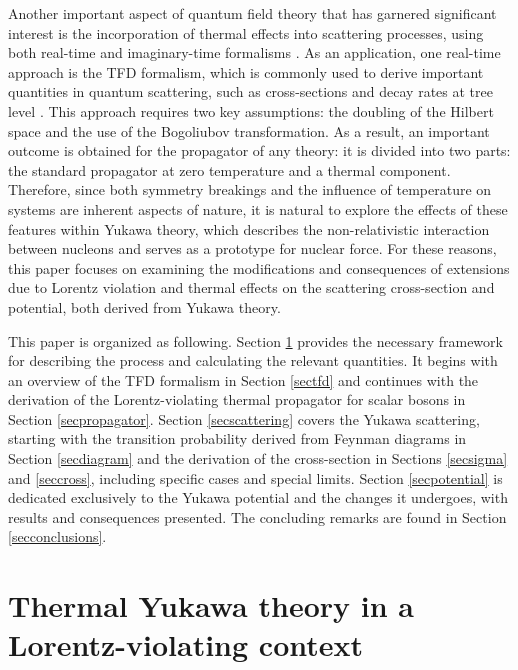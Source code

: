\documentclass[11pt,showpacs,preprintnumbers,amsmath,amssymb,prd,nofootinbib,superscriptaddress]{revtex4-2}
\begin{document}
Another important aspect of quantum field theory that has garnered significant interest is the incorporation of thermal effects into scattering processes, using both real-time and imaginary-time formalisms \cite{temp00, temp000, khannatfd, temp1, temp2, temp3, temp4}. As an application, one real-time approach is the TFD formalism, which is commonly used to derive important quantities in quantum scattering, such as cross-sections and decay rates at tree level \textcolor{red}{\cite{scatter2, santos2022temperature, santos2016quantized,santos2019thermal}}. This approach requires two key assumptions: the doubling of the Hilbert space and the use of the Bogoliubov transformation. As a result, an important outcome is obtained for the propagator of any theory: it is divided into two parts: the standard propagator at zero temperature and a thermal component. Therefore, since both symmetry breakings and the influence of temperature on systems are inherent aspects of nature, it is natural to explore the effects of these features within Yukawa theory, which describes the non-relativistic interaction between nucleons and serves as a prototype for nuclear force. For these reasons, this paper focuses on examining the modifications and consequences of extensions due to Lorentz violation and thermal effects on the scattering cross-section and potential, both derived from Yukawa theory. 

This paper is organized as following. Section \ref{sec1} provides the necessary framework for describing the process and calculating the relevant quantities. It begins with an overview of the TFD formalism in Section \ref{sectfd} and continues with the derivation of the Lorentz-violating thermal propagator for scalar bosons in Section \ref{secpropagator}. Section \ref{secscattering} covers the Yukawa scattering, starting with the transition probability derived from Feynman diagrams in Section \ref{secdiagram} and the derivation of the cross-section in Sections \ref{secsigma} and \ref{seccross}, including specific cases and special limits. Section \ref{secpotential} is dedicated exclusively to the Yukawa potential and the changes it undergoes, with results and consequences presented. The concluding remarks are found in Section \ref{secconclusions}.


\section{Thermal Yukawa theory in a Lorentz-violating context}\label{sec1}
\end{document}
